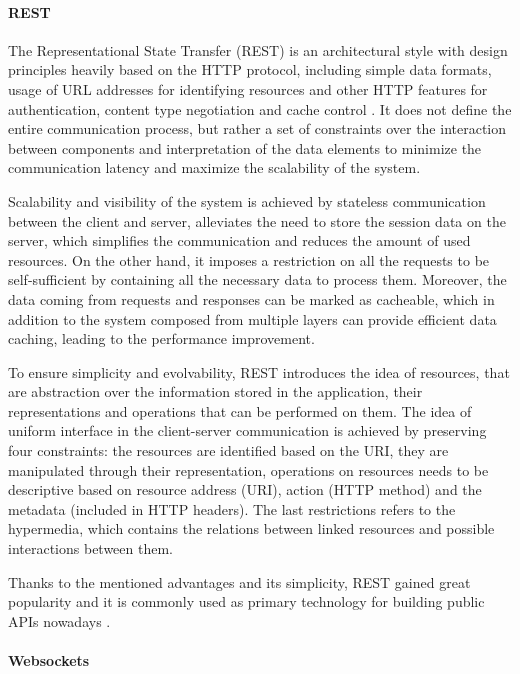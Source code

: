 \paragraph*{REST}

The Representational State Transfer (REST) is an architectural style with design principles heavily based on the HTTP protocol, including simple data formats, usage of URL addresses for identifying resources and other HTTP features for authentication, content type negotiation and cache control \cite{RESTPrincipledDesingOfModernWebArchitecture}. It does not define the entire communication process, but rather a set of constraints over the interaction between components and interpretation of the data elements to minimize the communication latency and maximize the scalability of the system.

Scalability and visibility of the system is achieved by stateless communication between the client and server, alleviates the need to store the session data on the server, which simplifies the communication and reduces the amount of used resources. On the other hand, it imposes a restriction on all the requests to be self-sufficient by containing all the necessary data to process them. Moreover, the data coming from requests and responses can be marked as cacheable, which in addition to the system composed from multiple layers can provide efficient data caching, leading to the performance improvement.

To ensure simplicity and evolvability, REST introduces the idea of resources, that are abstraction over the information stored in the application, their representations and operations that can be performed on them.
The idea of uniform interface in the client-server communication is achieved by preserving four constraints: the resources are identified based on the URI, they are manipulated through their representation, operations on resources needs to be descriptive based on resource address (URI), action (HTTP method) and the metadata (included in HTTP headers). The last restrictions refers to the hypermedia, which contains the relations between linked resources and possible interactions between them.

Thanks to the mentioned advantages and its simplicity, REST gained great popularity and it is commonly used as primary technology for building public APIs nowadays \cite{APIDesignInDistributedSystems}.

\paragraph*{Websockets}


